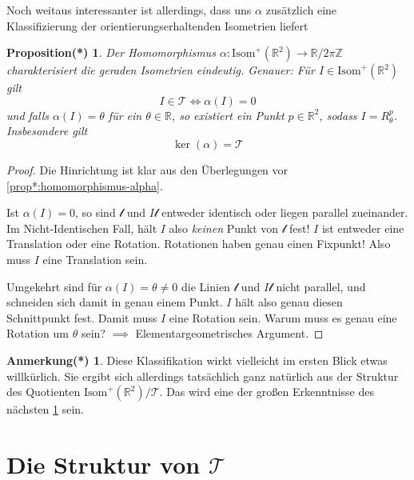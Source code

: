 \documentclass[a4paper, ngerman]{article}
\newcounter{chapter}
\numberwithin{equation}{chapter}
\theoremstyle{plain}
\newtheorem{propositionstrd}{Proposition(*)}[chapter]
\theoremstyle{definition}
\newtheorem{annotationstrd}{Anmerkung(*)}[chapter]
\newcommand{\geradisometr}{\ensuremath{\mathrm{Isom}^+(\mathbb R^2)}}
\begin{document}
\noindent Noch weitaus interessanter ist allerdings, dass uns \(\alpha\) zusätzlich eine Klassifizierung der orientierungserhaltenden Isometrien liefert
\begin{propositionstrd}\label{prop*:gruppentheo-klassifikation-gerader-isometrien}
    Der Homomorphismus \(\alpha: \mathrm{Isom}^+ (\mathbb R^2) \to \mathbb R/2\pi\mathbb Z\) charakterisiert die geraden Isometrien eindeutig. Genauer: Für \(I \in \geradisometr\) gilt 
    \begin{equation*}
        I \in \mathcal T \iff \alpha(I) = 0
    \end{equation*}
    und falls \(\alpha(I) = \theta\) für ein \(\theta \in \mathbb R\), so existiert ein Punkt \(p \in \mathbb R^2\), sodass \(I = R_\theta^p\). Insbesondere gilt 
    \begin{equation*}
        \ker(\alpha) = \mathcal T
    \end{equation*}
\end{propositionstrd}
\begin{proof}
    Die Hinrichtung ist klar aus den Überlegungen vor \cref{prop*:homomorphismus-alpha}. 

    Ist \(\alpha(I)=0\), so sind \(\mathscr l\) und \(I\mathscr l\) entweder identisch oder liegen parallel zueinander. Im Nicht-Identischen Fall, hält \(I\) also \textit{keinen} Punkt von \(\mathscr l\) fest! \(I\) ist entweder eine Translation oder eine Rotation. Rotationen haben genau einen Fixpunkt! Also muss \(I\) eine Translation sein. 

    Umgekehrt sind für \(\alpha(I)=\theta\neq0\) die Linien \(\mathscr l\) und \(I\mathscr l\) nicht parallel, und schneiden sich damit in genau einem Punkt. \(I\) hält also genau diesen Schnittpunkt fest. Damit muss \(I\) eine Rotation sein. Warum muss es genau eine Rotation um \(\theta\) sein? \(\implies\) Elementargeometrisches Argument. 
\end{proof}

\begin{annotationstrd}\label{ann*:alpha-ergibt-sich-aus-struktur}
    Diese Klassifikation wirkt vielleicht im ersten Blick etwas will\-kür\-lich. Sie ergibt sich allerdings tatsächlich ganz natürlich aus der Struktur des Quotienten \(\mathrm{Isom}^+(\mathbb R^2) /\mathcal T\). Das wird eine der großen Erkenntnisse des nächsten \cref{sec:struktur-von-translationen} sein. 
\end{annotationstrd}

\section{Die Struktur von \(\mathcal T\)}\label{sec:struktur-von-translationen}
\end{document}
